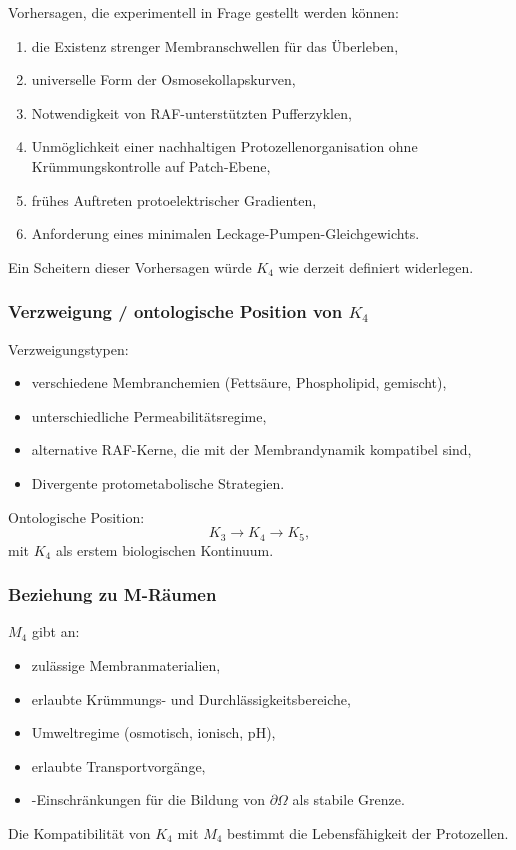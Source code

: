 Vorhersagen, die experimentell in Frage gestellt werden können:
\begin{enumerate}
    \item die Existenz strenger Membranschwellen für das Überleben,
    \item universelle Form der Osmosekollapskurven,
    \item Notwendigkeit von RAF-unterstützten Pufferzyklen,
    \item Unmöglichkeit einer nachhaltigen Protozellenorganisation ohne
          Krümmungskontrolle auf Patch-Ebene,
    \item frühes Auftreten protoelektrischer Gradienten,
    \item Anforderung eines minimalen Leckage-Pumpen-Gleichgewichts.
\end{enumerate}

Ein Scheitern dieser Vorhersagen würde $K_4$ wie derzeit definiert widerlegen.

\subsubsection{Verzweigung / ontologische Position von \texorpdfstring{$K_4$}{K_4}}

Verzweigungstypen:
\begin{itemize}
    \item verschiedene Membranchemien (Fettsäure, Phospholipid,
          gemischt),
    \item unterschiedliche Permeabilitätsregime,
    \item alternative RAF-Kerne, die mit der Membrandynamik kompatibel sind,
    \item Divergente protometabolische Strategien.
\end{itemize}

Ontologische Position:
\[
K_3 \to K_4 \to K_5,
\]
mit $K_4$ als erstem biologischen Kontinuum.

\subsubsection{Beziehung zu M-Räumen}

$M_4$ gibt an:
\begin{itemize}
    \item zulässige Membranmaterialien,
    \item erlaubte Krümmungs- und Durchlässigkeitsbereiche,
    \item Umweltregime (osmotisch, ionisch, pH),
    \item erlaubte Transportvorgänge,
    \item-Einschränkungen für die Bildung von $\partial\Omega$ als stabile Grenze.
\end{itemize}

Die Kompatibilität von $K_4$ mit $M_4$ bestimmt die Lebensfähigkeit der Protozellen.
